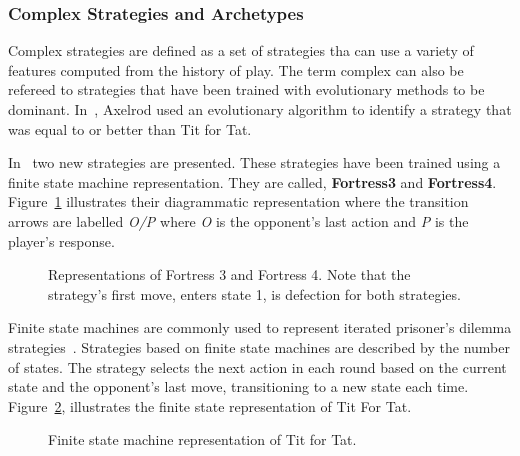 \documentclass{article}
\begin{document}
\subsubsection{Complex Strategies and Archetypes}

Complex strategies are defined as a set of strategies tha can use a variety of 
features computed from the history of play. The term complex can also be
refereed to strategies that have been trained with evolutionary methods to 
be dominant. In~\cite{Axelrod1987}, Axelrod used an evolutionary algorithm to 
identify a strategy that was equal to or better than Tit for Tat.

In~\cite{Ashlock2006b} two new strategies are presented. These strategies have
been trained using a finite state machine representation. They are called,
\textbf{Fortress3} and \textbf{Fortress4}. Figure~\ref{fig:fortress3_and_4}
illustrates their diagrammatic representation where the transition arrows are 
labelled \textit{O/P} where \textit{O} is the opponent's last action and \textit{P}
is the player's response.

\begin{figure}[!hbtp]
\centering
    \begin{subfigure}{.4\textwidth}
        
    \end{subfigure}
    \begin{subfigure}{.4\textwidth}\centering
        
     \end{subfigure}
     \caption{Representations of Fortress 3 and Fortress 4. Note that the
     strategy's first move, enters state 1, is defection for both strategies.}
     \label{fig:fortress3_and_4}
\end{figure}

Finite state machines are commonly used to represent iterated prisoner's
dilemma strategies~\cite{Miller1996, Rubinstein1986}. Strategies based on
finite state machines are described by the number of states.
The strategy selects the next action in each round based on the current state
and the opponent's last move, transitioning to a new state each time. Figure~\ref{fig:tit_for_tat_fsm},
illustrates the finite state representation of Tit For Tat.

\begin{figure}[!hbtp]
    \centering
    
    \caption{Finite state machine representation of Tit for Tat.}
    \label{fig:tit_for_tat_fsm}
\end{figure}
\end{document}
